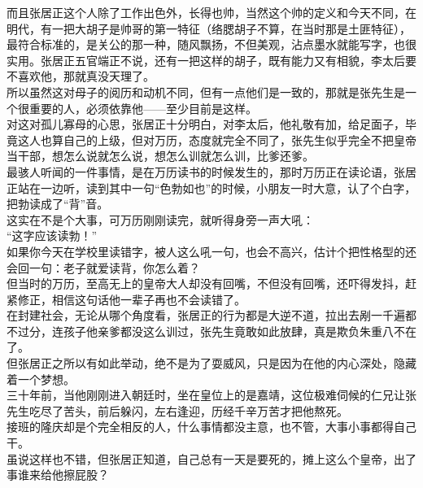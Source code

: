 \begin{multicols}{\theparacolNo}
而且张居正这个人除了工作出色外，长得也帅，当然这个帅的定义和今天不同，在明代，有一把大胡子是帅哥的第一特征（络腮胡子不算，在当时那是土匪特征），最符合标准的，是关公的那一种，随风飘扬，不但美观，沾点墨水就能写字，也很实用。张居正五官端正不说，还有一把这样的胡子，既有能力又有相貌，李太后要不喜欢他，那就真没天理了。\\

所以虽然这对母子的阅历和动机不同，但有一点他们是一致的，那就是张先生是一个很重要的人，必须依靠他——至少目前是这样。\\

对这对孤儿寡母的心思，张居正十分明白，对李太后，他礼敬有加，给足面子，毕竟这人也算自己的上级，但对万历，态度就完全不同了，张先生似乎完全不把皇帝当干部，想怎么说就怎么说，想怎么训就怎么训，比爹还爹。\\

最骇人听闻的一件事情，是在万历读书的时候发生的，那时万历正在读论语，张居正站在一边听，读到其中一句“色勃如也”的时候，小朋友一时大意，认了个白字，把勃读成了“背”音。\\

这实在不是个大事，可万历刚刚读完，就听得身旁一声大吼：\\

“这字应该读勃！”\\

如果你今天在学校里读错字，被人这么吼一句，也会不高兴，估计个把性格型的还会回一句：老子就爱读背，你怎么着？\\

但当时的万历，至高无上的皇帝大人却没有回嘴，不但没有回嘴，还吓得发抖，赶紧修正，相信这句话他一辈子再也不会读错了。\\

在封建社会，无论从哪个角度看，张居正的行为都是大逆不道，拉出去剐一千遍都不过分，连孩子他亲爹都没这么训过，张先生竟敢如此放肆，真是欺负朱重八不在了。\\

但张居正之所以有如此举动，绝不是为了耍威风，只是因为在他的内心深处，隐藏着一个梦想。\\

三十年前，当他刚刚进入朝廷时，坐在皇位上的是嘉靖，这位极难伺候的仁兄让张先生吃尽了苦头，前后躲闪，左右逢迎，历经千辛万苦才把他熬死。\\

接班的隆庆却是个完全相反的人，什么事情都没主意，也不管，大事小事都得自己干。\\

虽说这样也不错，但张居正知道，自己总有一天是要死的，摊上这么个皇帝，出了事谁来给他擦屁股？\\


\end{multicols}
